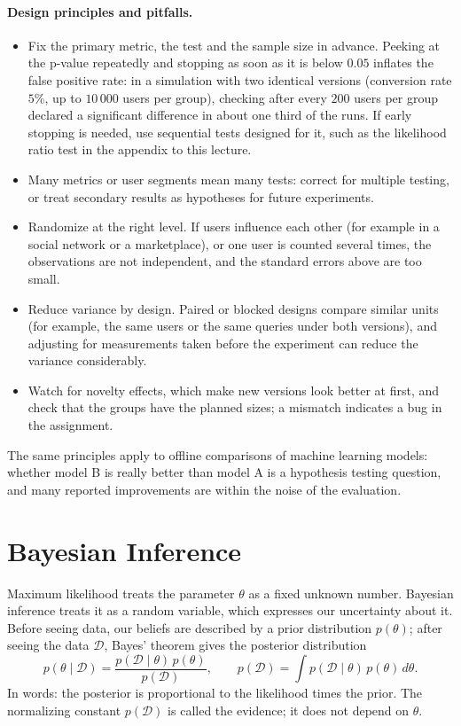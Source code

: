 \documentclass[11pt]{article}
\theoremstyle{definition}
\theoremstyle{plain}
\theoremstyle{remark}
\begin{document}
\paragraph{Design principles and pitfalls.}
\begin{itemize}
    \item Fix the primary metric, the test and the sample size in advance. Peeking at the p-value repeatedly and stopping as soon as it is below $0.05$ inflates the false positive rate: in a simulation with two identical versions (conversion rate $5\%$, up to $10\,000$ users per group), checking after every $200$ users per group declared a significant difference in about one third of the runs. If early stopping is needed, use sequential tests designed for it, such as the likelihood ratio test in the appendix to this lecture.
    \item Many metrics or user segments mean many tests: correct for multiple testing, or treat secondary results as hypotheses for future experiments.
    \item Randomize at the right level. If users influence each other (for example in a social network or a marketplace), or one user is counted several times, the observations are not independent, and the standard errors above are too small.
    \item Reduce variance by design. Paired or blocked designs compare similar units (for example, the same users or the same queries under both versions), and adjusting for measurements taken before the experiment can reduce the variance considerably.
    \item Watch for novelty effects, which make new versions look better at first, and check that the groups have the planned sizes; a mismatch indicates a bug in the assignment.
\end{itemize}
The same principles apply to offline comparisons of machine learning models: whether model B is really better than model A is a hypothesis testing question, and many reported improvements are within the noise of the evaluation.

\section{Bayesian Inference}\label{sec:bayesian}

Maximum likelihood treats the parameter $\theta$ as a fixed unknown number. Bayesian inference treats it as a random variable, which expresses our uncertainty about it. Before seeing data, our beliefs are described by a prior distribution $p(\theta)$; after seeing the data $\mathcal{D}$, Bayes' theorem gives the posterior distribution
\[p(\theta \mid \mathcal{D}) = \frac{p(\mathcal{D} \mid \theta)\,p(\theta)}{p(\mathcal{D})}, \qquad p(\mathcal{D}) = \int p(\mathcal{D} \mid \theta)\,p(\theta) \, d\theta.\]
In words: the posterior is proportional to the likelihood times the prior. The normalizing constant $p(\mathcal{D})$ is called the evidence; it does not depend on $\theta$.
\end{document}
